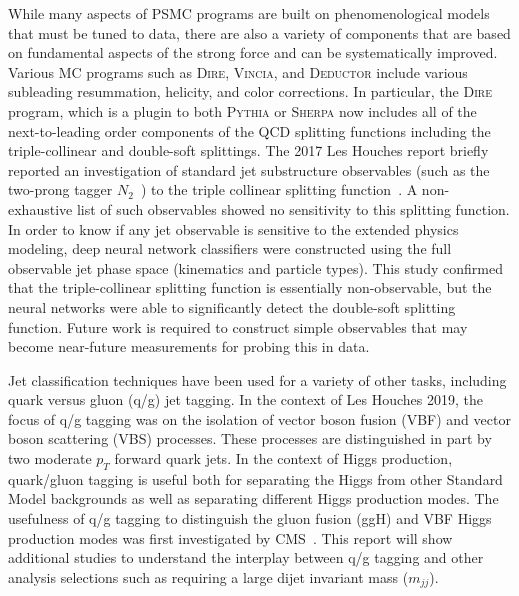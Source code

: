 \documentclass[11pt]{cernrep}
\begin{document}
While many aspects of PSMC programs are built on phenomenological models that must be tuned to data, there are also a variety of components that are based on fundamental aspects of the strong force and can be systematically improved.  Various MC programs such as \textsc{Dire}, \textsc{Vincia}, and \textsc{Deductor} include various subleading resummation, helicity, and color corrections.  In particular, the \textsc{Dire} program, which is a plugin to both \textsc{Pythia} or \textsc{Sherpa} now includes all of the next-to-leading order components of the QCD splitting functions including the triple-collinear and double-soft splittings.   The 2017 Les Houches report briefly reported an investigation of standard jet substructure observables (such as the two-prong tagger $N_2$~\cite{}) to the triple collinear splitting function~\cite{Bendavid:2018nar}.  A non-exhaustive list of such observables showed no sensitivity to this splitting function.  In order to know if any jet observable is sensitive to the extended physics modeling, deep neural network classifiers were constructed using the full observable jet phase space (kinematics and particle types).   This study confirmed that the triple-collinear splitting function is essentially non-observable, but the neural networks were able to significantly detect the double-soft splitting function.  Future work is required to construct simple observables that may become near-future measurements for probing this in data.

Jet classification techniques have been used for a variety of other tasks, including quark versus gluon (q/g) jet tagging.  In the context of Les Houches 2019, the focus of q/g tagging was on the isolation of vector boson fusion (VBF) and vector boson scattering (VBS) processes.  These processes are distinguished in part by two moderate $p_T$ forward quark jets.  In the context of Higgs production, quark/gluon tagging is useful both for separating the Higgs from other Standard Model backgrounds as well as separating different Higgs production modes.   The usefulness of q/g tagging to distinguish the gluon fusion (ggH) and VBF Higgs production modes was first investigated by CMS~\cite{}.  This report will show additional studies to understand the interplay between q/g tagging and other analysis selections such as requiring a large dijet invariant mass ($m_{jj}$).
\end{document}
